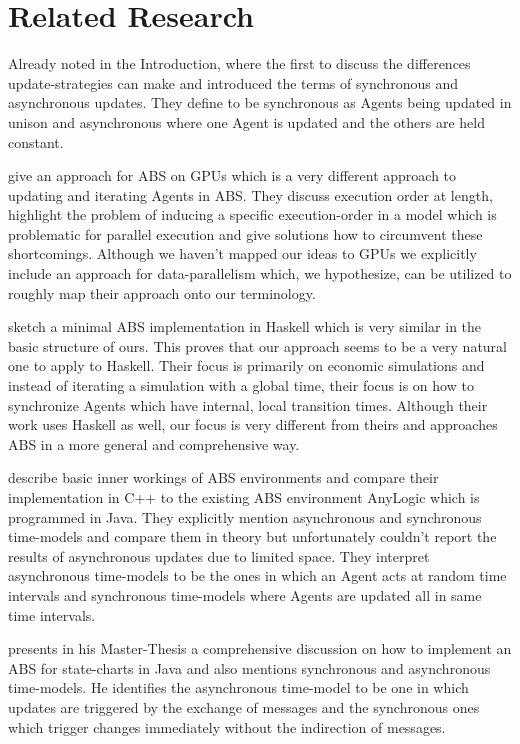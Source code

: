 \section{Related Research}
Already noted in the Introduction, \cite{huberman_evolutionary_1993} where the first to discuss the differences update-strategies can make and introduced the terms of synchronous and asynchronous updates. They define to be synchronous as Agents being updated in unison and asynchronous where one Agent is updated and the others are held constant.

\medskip

\cite{a_framework_2008} give an approach for ABS on GPUs which is a very different approach to updating and iterating Agents in ABS. They discuss execution order at length, highlight the problem of inducing a specific execution-order in a model which is problematic for parallel execution and give solutions how to circumvent these shortcomings. Although we haven't mapped our ideas to GPUs we explicitly include an approach for data-parallelism which, we hypothesize, can be utilized to roughly map their approach onto our terminology. 
	
\medskip
	
\cite{botta_time_2010} sketch a minimal ABS implementation in Haskell which is very similar in the basic structure of ours. This proves that our approach seems to be a very natural one to apply to Haskell. Their focus is primarily on economic simulations and instead of iterating a simulation with a global time, their focus is on how to synchronize Agents which have internal, local transition times. Although their work uses Haskell as well, our focus is very different from theirs and approaches ABS in a more general and comprehensive way.

\medskip

\cite{dawson_opening_2014} describe basic inner workings of ABS environments and compare their implementation in C++ to the existing ABS environment AnyLogic which is programmed in Java. They explicitly mention asynchronous and synchronous time-models and compare them in theory but unfortunately couldn't report the results of asynchronous updates due to limited space. They interpret asynchronous time-models to be the ones in which an Agent acts at random time intervals and synchronous time-models where Agents are updated all in same time intervals.

\medskip

\cite{yuxuan_agent-based_2016} presents in his Master-Thesis a comprehensive discussion on how to implement an ABS for state-charts in Java and also mentions synchronous and asynchronous time-models. He identifies the asynchronous time-model to be one in which updates are triggered by the exchange of messages and the synchronous ones which trigger changes immediately without the indirection of messages.

